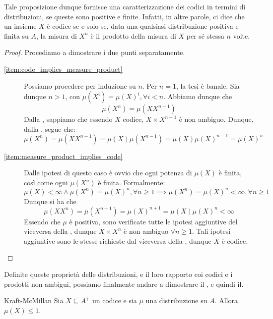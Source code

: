 Tale proposizione dunque fornisce una caratterizzazione dei codici in termini di distribuzioni, se queste sono positive e finite.
Infatti, in altre parole, ci dice che un insieme \(X\) è codice se e solo se, data una qualsiasi distribuzione positiva e finita su \(A\), la misura di \(X^n\) è il prodotto della misura di \(X\) per sé stessa \(n\) volte.
\begin{proof}
  Procediamo a dimostrare i due punti separatamente.
  \begin{description}
    \item[\ref{item:code_implies_measure_product}] Possiamo procedere per induzione su \(n\).
      Per \(n=1\), la tesi è banale.
      Sia dunque \(n>1\), con \(\mu(X^i) = {\mu(X)}^i, \forall i < n\).
      Abbiamo dunque che 
      \[\mu(X^n)=\mu(XX^{n-1})\]
      Dalla , sappiamo che essendo \(X\) codice, \(X \times X^{n-1}\) è non ambiguo.
      Dunque, dalla , segue che:
      \[\mu(X^n)=\mu(XX^{n-1}) = \mu(X)\mu(X^{n-1}) = \mu(X) {\mu(X)}^{n-1} = {\mu(X)}^n\]

    \item[\ref{item:measure_product_implies_code}] Dalle ipotesi di questo caso è ovvio che ogni potenza di \(\mu(X)\) è finita, così come ogni \(\mu(X^n)\) è finita.
    Formalmente:
    \[\mu(X)<\infty \land \mu(X^n) = {\mu(X)}^n, \forall n \geq 1 \implies \mu(X^n) = {\mu(X)}^n < \infty, \forall n \geq 1\]
    Dunque si ha che
    \[\mu(XX^n) = \mu(X^{n+1}) = {\mu(X)}^{n+1} = \mu(X){\mu(X)}^n < \infty\]
    Essendo che \(\mu\) è positiva, sono verificate tutte le ipotesi aggiuntive del viceversa della , dunque \(X \times X^n\) è non ambiguo \(\forall n \geq 1\).
    Tali ipotesi aggiuntive sono le stesse richieste dal viceversa della , dunque \(X\) è codice.
  \end{description}
\end{proof}
Definite queste proprietà delle distribuzioni, e il loro rapporto coi codici e i prodotti non ambigui, possiamo finalmente andare a dimostrare il , e quindi il.

\begin{theorem}[namedlabel={thm:kraft-mcmillan}{Kraft-McMillan}]{Kraft-McMillan}
  Sia \(X \subseteq A^+\) un codice e sia \(\mu\) una distribuzione su \(A\).
  Allora \(\mu(X) \leq 1\).
\end{theorem}

